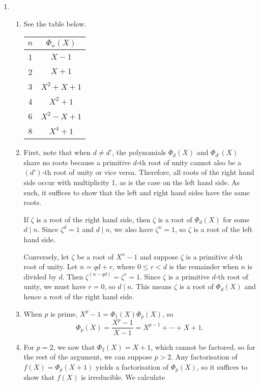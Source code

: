 \begin{enumerate}
\item \begin{enumerate}
\item See the table below.
\begin{center}
\begingroup
\setlength{\tabcolsep}{10pt}
\renewcommand{\arraystretch}{1.5}
\begin{tabular}{|c|c|} \hline
$n$ & $\Phi_n(X)$ \\ \hline
1 & $X - 1$ \\ \hline
2 & $X + 1$ \\ \hline
3 & $X^2 + X + 1$ \\ \hline
4 & $X^2 + 1$ \\ \hline
6 & $X^2 - X + 1$ \\ \hline
8 & $X^4 + 1$ \\ \hline
\end{tabular}
\endgroup
\end{center}
\item First, note that when $d\neq d'$, the polynomials $\Phi_d(X)$ and $\Phi_{d'}(X)$ share no roots because a primitive $d$-th root of unity cannot also be a $(d')$-th root of unity or vice versa. Therefore, all roots of the right hand side occur with multiplicity 1, as is the case on the left hand side. As such, it suffices to show that the left and right hand sides have the same roots.\par
If $\zeta$ is a root of the right hand side, then $\zeta$ is a root of $\Phi_d(X)$ for some $d\mid n$. Since $\zeta^d = 1$ and $d\mid n$, we also have $\zeta^n = 1$, so $\zeta$ is a root of the left hand side.\par
Conversely, let $\zeta$ be a root of $X^n - 1$ and suppose $\zeta$ is a primitive $d$-th root of unity. Let $n = qd + r$, where $0\leq r < d$ is the remainder when $n$ is divided by $d$. Then $\zeta^(n - qd) = \zeta^r = 1$. Since $\zeta$ is a primitive $d$-th root of unity, we must have $r = 0$, so $d\mid n$. This means $\zeta$ is a root of $\Phi_d(X)$ and hence a root of the right hand side.
\item When $p$ is prime, $X^p - 1 = \Phi_1(X)\Phi_p(X)$, so
\begin{equation*}
\Phi_p(X) = \frac{X^p - 1}{X - 1} = X^{p - 1} + \cdots + X + 1.
\end{equation*}
\item For $p = 2$, we saw that $\Phi_2(X) = X + 1$, which cannot be factored, so for the rest of the argument, we can suppose $p > 2$. Any factorisation of $f(X) = \Phi_p(X + 1)$ yields a factorisation of $\Phi_p(X)$, so it suffices to show that $f(X)$ is irreducible. We calculate

\end{enumerate}
\end{enumerate}
